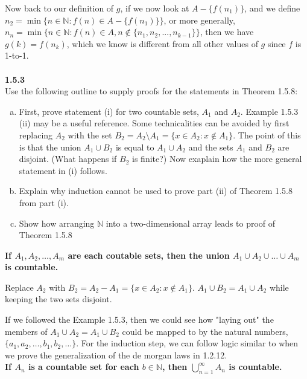 Now back to our definition of $g$, if we now look at $A - \{f(n_1)\}$, and we define
$n_2 = \min \{ n \in \mathbb{N} : f(n) \in A - \{f(n_1)\} \}$, or more generally,
$n_n = \min \{ n \in \mathbb{N} : f(n) \in A, n \notin \{n_1, n_2, ..., n_{k-1}\} \}$,
then we have $g(k) = f(n_k)$, which we know is different from all other values of $g$ since $f$ is 1-to-1.
\\~\\


\label{abbott:1.5.3}
\textbf{1.5.3}
\\

Use the following outline to supply proofs for the statements in Theorem 1.5.8:

\begin{enumerate}[(a)]
\item First, prove statement (i) for two countable sets, $A_1$ and $A_2$. Example 1.5.3 (ii) may be a useful reference.
    Some technicalities can be avoided by first replacing $A_2$ with the set $B_2 = A_2\setminus A_1 = \{ x \in A_2 : x \not\in A_1 \}$.
    The point of this is that the union $A_1 \cup B_2$ is equal to $A_1 \cup A_2$ and the sets $A_1$ and $B_2$ are disjoint.
    (What happens if $B_2$ is finite?)
    Now exaplain how the more general statement in (i) follows.

\item Explain why induction cannot be used to prove part (ii) of Theorem 1.5.8 from part (i).

\item Show how arranging $\mathbb{N}$ into a two-dimensional array leads to proof of Theorem 1.5.8
\end{enumerate}


\textbf{If $A_1, A_2, \ldots, A_m$ are each coutable sets, then the union $A_1 \cup A_2 \cup \ldots \cup A_m$ is countable.}

Replace $A_2$ with $B_2 = A_2 - A_1 = \{ x \in A_2 : x \notin A_1 \}$.
$A_1 \cup B_2  = A_1 \cup A_2$ while keeping the two sets disjoint.

If we followed the Example 1.5.3, then we could see how "laying out" the members of $A_1 \cup A_2 = A_1 \cup B_2$ could be
mapped to by the natural numbers, $\{ a_1, a_2, \ldots, b_1, b_2, \ldots \}$.
For the induction step, we can follow logic similar to when we prove the generalization of the de morgan laws in 1.2.12.
\\

\textbf{If $A_n$ is a countable set for each $b \in \mathbb{N}$, then $\bigcup^{\infty}_{n=1} A_n$ is countable.}

